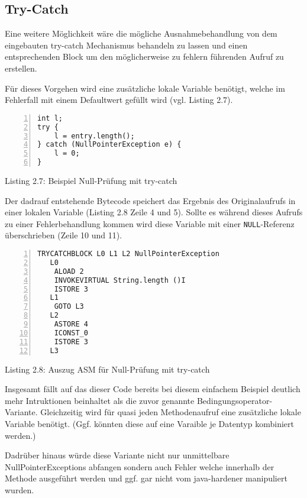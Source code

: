 \vspace{0.3cm}


\subsection{Try-Catch}

Eine weitere Möglichkeit wäre die mögliche Ausnahmebehandlung von dem eingebauten
try-catch Mechanismus behandeln zu lassen und einen entsprechenden Block um
den möglicherweise zu fehlern führenden Aufruf zu erstellen.

Für dieses Vorgehen wird eine zusätzliche lokale Variable benötigt,
welche im Fehlerfall mit einem Defaultwert gefüllt wird (vgl. Listing 2.7).

\begin{lstlisting}[basicstyle=\ttfamily,numbers=left,numberstyle=\footnotesize\ttfamily,backgroundcolor=\color{source}]
int l;
try {
	l = entry.length();
} catch (NullPointerException e) {
	l = 0;
}
\end{lstlisting}
\centerline{Listing 2.7: Beispiel Null-Prüfung mit try-catch}

\vspace{0.3cm}

Der dadrauf entstehende Bytecode speichert das Ergebnis des Originalaufrufs
in einer lokalen Variable (Listing 2.8 Zeile 4 und 5). Sollte es während
dieses Aufrufs zu einer Fehlerbehandlung kommen wird diese Variable mit
einer \texttt{NULL}-Referenz überschrieben (Zeile 10 und 11).


\begin{lstlisting}[basicstyle=\ttfamily,numbers=left,numberstyle=\footnotesize\ttfamily,backgroundcolor=\color{source}]
    TRYCATCHBLOCK L0 L1 L2 NullPointerException
   L0
    ALOAD 2
    INVOKEVIRTUAL String.length ()I
    ISTORE 3
   L1
    GOTO L3
   L2
    ASTORE 4
    ICONST_0
    ISTORE 3
   L3
\end{lstlisting}
\centerline{Listing 2.8: Auszug ASM für Null-Prüfung mit try-catch}

\vspace{0.3cm}

Insgesamt fällt auf das dieser Code bereits bei diesem einfachem Beispiel deutlich
mehr Intruktionen beinhaltet als die zuvor genannte Bedingungsoperator-Variante.
Gleichzeitig wird für quasi jeden Methodenaufruf eine zusätzliche lokale Variable
benötigt. (Ggf. könnten diese auf eine Varaible je Datentyp kombiniert werden.)

Dadrüber hinaus würde diese Variante nicht nur unmittelbare NullPointerExceptions
abfangen sondern auch Fehler welche innerhalb der Methode ausgeführt werden und
ggf. gar nicht vom java-hardener manipuliert wurden.

